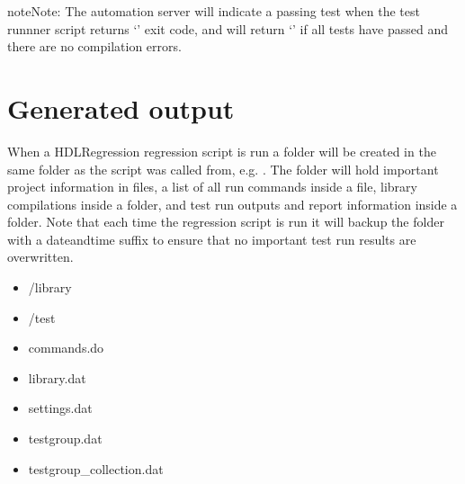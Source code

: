 \documentclass[letterpaper,10pt,english]{sphinxmanual}
\let\sphinxpxdimen\pdfpxdimen\else\newdimen\sphinxpxdimen
\begin{document}
\begin{sphinxadmonition}{note}{Note:}
\sphinxAtStartPar
The automation server will indicate a passing test when the test runnner script returns ‘’ exit code,
and  will return ‘’ if all tests have passed and there are no compilation errors.
\end{sphinxadmonition}

\sphinxAtStartPar
{}

\noindent{\hspace*{\fill}\sphinxincludegraphics[width=750\sphinxpxdimen]{{jenkins_ci}.png}\hspace*{\fill}}

\sphinxstepscope


\chapter{Generated output}
\label{\detokenize{output:generated-output}}\label{\detokenize{output::doc}}
\sphinxAtStartPar
When a HDLRegression regression script is run a folder  will be created in the same folder as the script was called
from, e.g. . The folder will hold important project information in  files, a list of all run commands inside
a  file, library compilations inside a  folder, and test run outputs and report information inside
a  folder. Note that each time the regression script is run it will back\sphinxhyphen{}up the  folder with a date\sphinxhyphen{}and\sphinxhyphen{}time
suffix to ensure that no important test run results are overwritten.
\begin{itemize}
\item {} 
\sphinxAtStartPar
/library

\item {} 
\sphinxAtStartPar
/test

\item {} 
\sphinxAtStartPar
commands.do

\item {} 
\sphinxAtStartPar
library.dat

\item {} 
\sphinxAtStartPar
settings.dat

\item {} 
\sphinxAtStartPar
testgroup.dat

\item {} 
\sphinxAtStartPar
testgroup\_collection.dat

\end{itemize}
\end{document}
